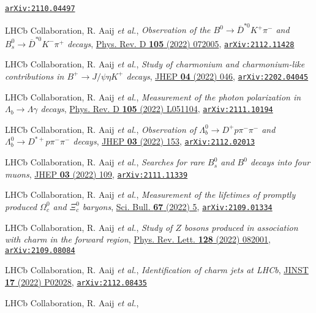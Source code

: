 \documentclass[a4paper, 11pt]{article}
\newenvironment{cvcontent}{
  \leftskip=0.5cm\rightskip=0cm
  \noindent\ignorespaces}{\par}
\newcommand{\arxiv}[1]{\href{https://arxiv.org/abs/#1}{\texttt{arXiv:#1}}}
\begin{document}
\begin{cvcontent}
\begin{enumerate}[label={[\arabic*]}, leftmargin=1.5cm]
    \arxiv{2110.04497}
    \item LHCb Collaboration, R. Aaij \emph{et al.}, 
    \emph{Observation of the $B^0\rightarrow\overline{D}^{*0}K^{+}\pi^{-}$ and $B_s^0\rightarrow\overline{D}^{*0}K^{-}\pi^{+}$ decays},
    \href{https://link.aps.org/doi/10.1103/PhysRevD.105.072005}{Phys. Rev. D \textbf{105} (2022) 072005},
    \arxiv{2112.11428}
    \item LHCb Collaboration, R. Aaij \emph{et al.},
    \emph{Study of charmonium and charmonium-like contributions in $B^+ \rightarrow J/\psi \eta K^+$ decays},
    \href{https://doi.org/10.1007/JHEP04(2022)046}{JHEP \textbf{04} (2022) 046},
    \arxiv{2202.04045}
    \item LHCb Collaboration, R. Aaij \emph{et al.}, 
    \emph{Measurement of the photon polarization in $\Lambda_b \to \Lambda \gamma$ decays},
    \href{https://link.aps.org/doi/10.1103/PhysRevD.105.L051104}{Phys. Rev. D \textbf{105} (2022) L051104},
    \arxiv{2111.10194}
    \item LHCb Collaboration, R. Aaij \emph{et al.}, 
    \emph{Observation of $\Lambda_b^0\rightarrow D^+ p \pi^-\pi^-$ and $\Lambda_b^0\rightarrow D^{*+} p \pi^-\pi^-$ decays},
    \href{https://doi.org/10.1007/JHEP03(2022)153}{JHEP \textbf{03} (2022) 153},
    \arxiv{2112.02013}
    \item LHCb Collaboration, R. Aaij \emph{et al.}, 
    \emph{Searches for rare $B_s^0$ and $B^0$ decays into four muons},
    \href{https://doi.org/10.1007/JHEP03(2022)109}{JHEP \textbf{03} (2022) 109},
    \arxiv{2111.11339}
    \item LHCb Collaboration, R. Aaij \emph{et al.}, 
    \emph{Measurement of the lifetimes of promptly produced $\Omega^{0}_{c}$ and $\Xi^{0}_{c}$ baryons},
    \href{https://doi.org/10.1016/j.scib.2021.11.022}{Sci. Bull. \textbf{67} (2022) 5},
    \arxiv{2109.01334}
    \item LHCb Collaboration, R. Aaij \emph{et al.}, 
    \emph{Study of $Z$ bosons produced in association with charm in the forward region},
    \href{https://journals.aps.org/prl/abstract/10.1103/PhysRevLett.128.082001}{Phys. Rev. Lett. \textbf{128} (2022) 082001},
    \arxiv{2109.08084}
    \item LHCb Collaboration, R. Aaij \emph{et al.}, 
    \emph{Identification of charm jets at LHCb},
    \href{https://doi.org/10.1088/1748-0221/17/02/p02028}{JINST \textbf{17} (2022) P02028},
    \arxiv{2112.08435}
    \item LHCb Collaboration, R. Aaij \emph{et al.}, 

\end{enumerate}
\end{cvcontent}
\end{document}
